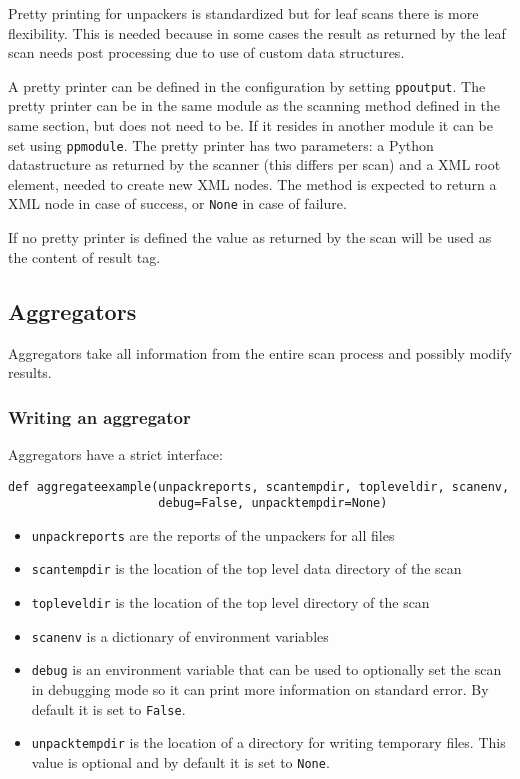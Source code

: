 \documentclass[10pt]{article}
\begin{document}
Pretty printing for unpackers is standardized but for leaf scans there is
more flexibility. This is needed because in some cases the result as returned
by the leaf scan needs post processing due to use of custom data structures.

A pretty printer can be defined in the configuration by setting
\texttt{ppoutput}. The pretty printer can be in the same module as the scanning
method defined in the same section, but does not need to be. If it resides in
another module it can be set using \texttt{ppmodule}. The pretty printer has two
parameters: a Python datastructure as returned by the scanner (this differs
per scan) and a XML root element, needed to create new XML nodes. The method is
expected to return a XML node in case of success, or \texttt{None} in case of
failure.

If no pretty printer is defined the value as returned by the scan will be used
as the content of result tag.

\subsection{Aggregators}

Aggregators take all information from the entire scan process and possibly
modify results.

\subsubsection{Writing an aggregator}

Aggregators have a strict interface:

\begin{verbatim}
def aggregateexample(unpackreports, scantempdir, topleveldir, scanenv,
                     debug=False, unpacktempdir=None)
\end{verbatim}

\begin{itemize}
\item \texttt{unpackreports} are the reports of the unpackers for all files
\item \texttt{scantempdir} is the location of the top level data directory of
the scan
\item \texttt{topleveldir} is the location of the top level directory of the
scan
\item \texttt{scanenv} is a dictionary of environment variables
\item \texttt{debug} is an environment variable that can be used to optionally
set the scan in debugging mode so it can print more information on standard
error. By default it is set to \texttt{False}.
\item \texttt{unpacktempdir} is the location of a directory for writing
temporary files. This value is optional and by default it is set to
\texttt{None}.
\end{itemize}
\end{document}
